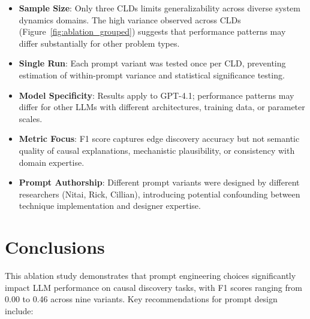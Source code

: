 \begin{itemize}
    \item \textbf{Sample Size}: Only three CLDs limits generalizability across diverse system dynamics domains. The high variance observed across CLDs (Figure~\ref{fig:ablation_grouped}) suggests that performance patterns may differ substantially for other problem types.
    
    \item \textbf{Single Run}: Each prompt variant was tested once per CLD, preventing estimation of within-prompt variance and statistical significance testing.
    
    \item \textbf{Model Specificity}: Results apply to GPT-4.1; performance patterns may differ for other LLMs with different architectures, training data, or parameter scales.
    
    \item \textbf{Metric Focus}: F1 score captures edge discovery accuracy but not semantic quality of causal explanations, mechanistic plausibility, or consistency with domain expertise.
    
    \item \textbf{Prompt Authorship}: Different prompt variants were designed by different researchers (Nitai, Rick, Cillian), introducing potential confounding between technique implementation and designer expertise.
\end{itemize}

\section{Conclusions}

This ablation study demonstrates that prompt engineering choices significantly impact LLM performance on causal discovery tasks, with F1 scores ranging from 0.00 to 0.46 across nine variants. Key recommendations for prompt design include:

